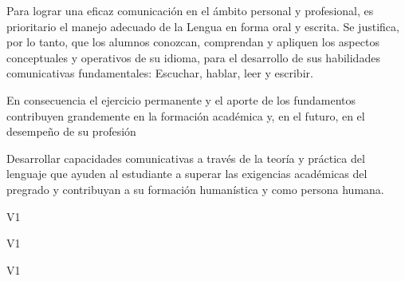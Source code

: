 \begin{syllabus}


\begin{justification}
Para lograr una eficaz comunicación en el ámbito personal y profesional, 
es prioritario el manejo adecuado de la Lengua en forma oral y escrita. 
Se justifica, por lo tanto, que los alumnos conozcan, comprendan y apliquen 
los aspectos conceptuales y operativos de su idioma, para el desarrollo 
de sus habilidades comunicativas fundamentales: Escuchar, hablar, leer y escribir.

En consecuencia el ejercicio permanente y el aporte de los fundamentos 
contribuyen grandemente en la formación académica y, en el futuro, 
en el desempeño de su profesión
\end{justification}

\begin{goals}
\item Desarrollar capacidades comunicativas a través de la teoría y práctica del lenguaje que ayuden al estudiante a superar las exigencias académicas del pregrado y contribuyan a su formación humanística y como persona humana.
\end{goals}

\begin{outcomes}{V1}
   \item {}
   \item {}
\end{outcomes}

\begin{specificoutcomes}{V1}
    \item {}
    \item {}
\end{specificoutcomes}

\begin{competences}{V1}
    \item {}
    \item {}
    \item {}
\end{competences}


\end{syllabus}
